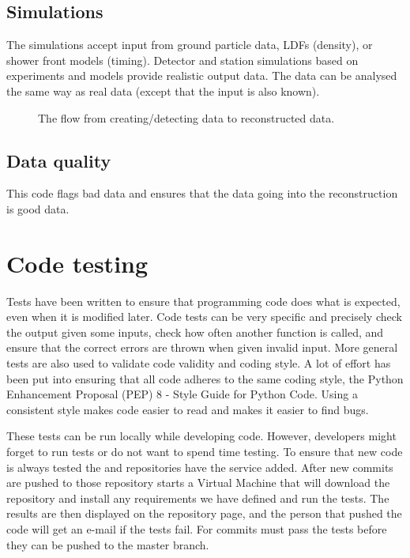 \subsection{Simulations}

The simulations accept input from \corsika ground particle data, LDFs
(density), or shower front models (timing). Detector and station simulations based on experiments and models provide realistic output data. The data can be analysed the same way as real \hisparc data (except that the input is
also known).

\begin{figure}
    \centering
    
    \caption{ The flow from
             creating/detecting data to reconstructed data.}
    \label{fig:sapphire-flow}
\end{figure}


\subsection{Data quality}

This code flags bad data and ensures that the data going into the
reconstruction is good data.



\section{Code testing}

Tests have been written to ensure that programming code does what is
expected, even when it is modified later. Code tests can be very
specific and precisely check the output given some inputs, check how
often another function is called, and ensure that the correct errors are
thrown when given invalid input. More general tests are also used to
validate code validity and coding style. A lot of effort has been put
into ensuring that all \python code adheres to the same coding style,
the Python Enhancement Proposal (PEP) 8 - Style Guide for Python Code. Using a consistent style makes code easier to read and makes it easier to find bugs.

These tests can be run locally while developing code. However,
developers might forget to run tests or do not want to spend time
testing. To ensure that new code is always tested the \sapphire and
\jsparc repositories have the \travis service \cite{travis} added. After
new commits are pushed to those repository \travis starts a Virtual
Machine that will download the repository and install any requirements we have defined and run the tests. The results are then displayed on the
repository page, and the person that pushed the code will get an e-mail
if the tests fail. For \sapphire commits must pass the tests before they can be pushed to the master branch.


